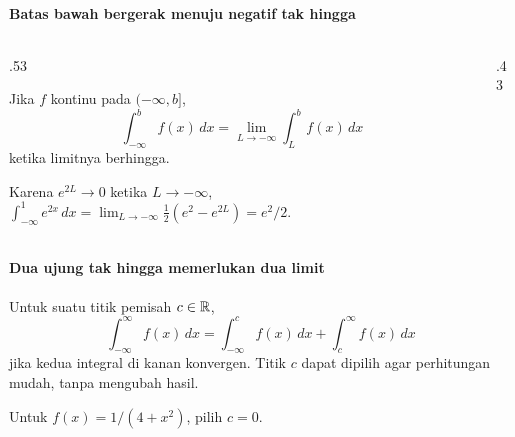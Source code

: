 \documentclass{../../kalkulus-ppt}
\begin{document}
\begin{frame}{\insertsection}
    \framesubtitle{Batas bawah bergerak menuju negatif tak hingga}
    \begin{columns}[c,onlytextwidth]
        \begin{column}{.53\textwidth}
            \begin{definisi}[{Selang $(-\infty,b]$}]
                Jika $f$ kontinu pada $(-\infty,b]$,
                \[
                    \int_{-\infty}^{b}f(x)\,dx
                       =\lim_{L\to-\infty}\int_L^{b}f(x)\,dx
                \]
                ketika limitnya berhingga.
            \end{definisi}
            \begin{contoh}
                Karena $e^{2L}\to0$ ketika $L\to-\infty$,
                $\int_{-\infty}^1e^{2x}\,dx=
                \lim_{L\to-\infty}\tfrac12(e^2-e^{2L})=e^2/2$.
            \end{contoh}
        \end{column}
        \begin{column}{.43\textwidth}
            \centering
        \end{column}
    \end{columns}
\end{frame}

\begin{frame}{\insertsection}
    \framesubtitle{Dua ujung tak hingga memerlukan dua limit}
    \begin{definisi}
        Untuk suatu titik pemisah $c\in\mathbb{R}$,
        \[
            \int_{-\infty}^\infty f(x)\,dx
              =\int_{-\infty}^{c}f(x)\,dx+\int_c^\infty f(x)\,dx
        \]
        jika kedua integral di kanan konvergen. Titik $c$ dapat dipilih
        agar perhitungan mudah, tanpa mengubah hasil.
    \end{definisi}
    \begin{contoh}
        Untuk $f(x)=1/(4+x^2)$, pilih $c=0$.
    \end{contoh}
\end{frame}
\end{document}
